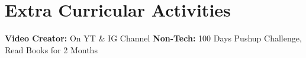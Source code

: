 \documentclass[letterpaper,11pt]{article}
\newcommand{\resumeItem}[2]{
  \item\small{
    \textbf{#1}{: #2 \vspace{-2pt}}
  }
}
\newcommand{\resumeSubItem}[2]{\resumeItem{#1}{#2}\vspace{-4pt}}
\newcommand{\resumeSubHeadingListStart}{\begin{itemize}[leftmargin=*]}
\newcommand{\resumeSubHeadingListEnd}{\end{itemize}}
\begin{document}
%
\section{Extra Curricular Activities}
     \textbf{Video Creator: }{On YT \& IG Channel}
     \hfill
     \textbf{Non-Tech: }{100 Days Pushup Challenge, Read Books for 2 Months}







\end{document}
